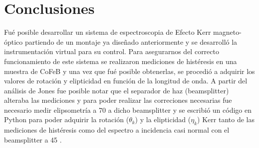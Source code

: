 \documentclass[paper=letter, fontsize=12pt]{scrartcl}
\numberwithin{equation}{section}		%
\numberwithin{figure}{section}			%
\numberwithin{table}{section}				%
\begin{document}
\section{Conclusiones}
Fu\'e posible  desarrollar un sistema de espectroscopia de Efecto Kerr magneto-\'optico partiendo de un montaje ya dise\~nado anteriormente y se desarroll\'o la instrumentaci\'on virtual para su control. Para asegurarnos  del correcto funcionamiento de este sistema se realizaron mediciones de hist\'eresis en una muestra de CoFeB y una vez que fu\'e posible obtenerlas, se procedi\'o a adquirir los valores de rotaci\'on y elipticidad en funci\'on de la longitud de onda. A partir  del an\'alisis de Jones fue posible notar que el separador de haz (beamsplitter) alteraba las mediciones y para poder realizar las correciones necesarias fue necesario medir elipsometr\'ia a 70 \degree a dicho beamsplitter y   se escribi\'o un c\'odigo en Python para poder adquirir la rotaci\'on ($\theta_k$) y la elipticidad ($\eta_k$)  Kerr tanto de las mediciones de hist\'eresis como del espectro a incidencia casi normal con el beamsplitter a 45 \degree.
    
    
\end{document}
